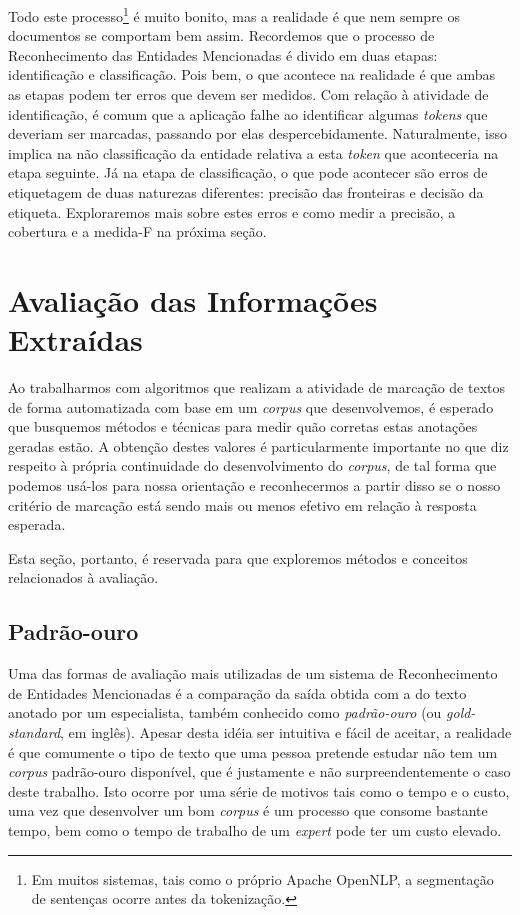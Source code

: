 \documentclass[11pt]{report}
\begin{document}
Todo este processo\footnote[9]{Em muitos sistemas, tais como o próprio Apache OpenNLP, a segmentação de sentenças ocorre antes da tokenização.} é muito bonito, mas a realidade é que nem sempre
os documentos se comportam bem assim. Recordemos que o processo de Reconhecimento das Entidades Mencionadas
é divido em duas etapas: identificação e classificação. Pois bem, o que acontece na realidade é que ambas as etapas podem ter erros que devem ser medidos. Com relação
à atividade de identificação, é comum que a aplicação falhe ao identificar algumas \textit{tokens} que deveriam ser marcadas, passando por elas despercebidamente. Naturalmente, isso
implica na não classificação da entidade relativa a esta \textit{token} que aconteceria na etapa seguinte. Já na etapa de classificação, o que pode acontecer são erros de etiquetagem
de duas naturezas diferentes: precisão das fronteiras e decisão da etiqueta. Exploraremos mais sobre estes erros e como medir a precisão, a cobertura e a medida-F na próxima seção.

\section{Avaliação das Informações Extraídas}

\indent\indent Ao trabalharmos com algoritmos que realizam a atividade de marcação de textos de forma automatizada com base em um \textit{corpus} que desenvolvemos, é
esperado que busquemos métodos e técnicas para medir quão corretas estas anotações geradas estão. A obtenção destes valores é particularmente
importante no que diz respeito à própria continuidade do desenvolvimento do \textit{corpus}, de tal forma que podemos usá-los para nossa orientação e
reconhecermos a partir disso se o nosso critério de marcação está sendo mais ou menos efetivo em relação à resposta esperada.

Esta seção, portanto,
é reservada para que exploremos métodos e conceitos relacionados à avaliação.

\subsection{Padrão-ouro}

\indent\indent Uma das formas de avaliação mais utilizadas de um sistema de Reconhecimento de Entidades Mencionadas é a comparação da saída obtida com a do texto anotado por
um especialista, também conhecido como \textit{padrão-ouro} (ou \textit{gold-standard}, em inglês). Apesar desta idéia ser intuitiva e fácil de aceitar, a realidade é que
comumente o tipo de texto que uma pessoa pretende estudar não tem um \textit{corpus} padrão-ouro disponível, que é justamente e não surpreendentemente o caso deste trabalho. Isto ocorre
por uma série de motivos tais como o tempo e o custo, uma vez que desenvolver um bom \textit{corpus} é um processo que consome bastante tempo, bem como o tempo de trabalho de um \textit{expert}
pode ter um custo elevado.
\end{document}

